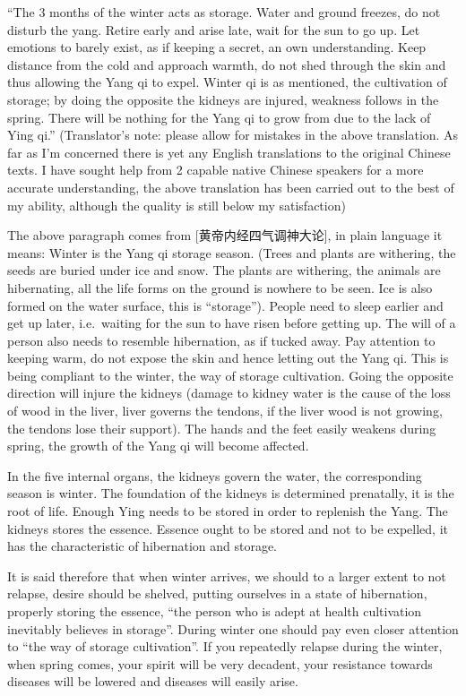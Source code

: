 \documentclass[
]{book}
\begin{document}
``The 3 months of the winter acts as storage. Water and ground freezes, do not disturb the yang. Retire early and arise late, wait for the sun to go up. Let emotions to barely exist, as if keeping a secret, an own understanding. Keep distance from the cold and approach warmth, do not shed through the skin and thus allowing the Yang qi to expel. Winter qi is as mentioned, the cultivation of storage; by doing the opposite the kidneys are injured, weakness follows in the spring. There will be nothing for the Yang qi to grow from due to the lack of Ying qi.'' (Translator's note: please allow for mistakes in the above translation. As far as I'm concerned there is yet any English translations to the original Chinese texts. I have sought help from 2 capable native Chinese speakers for a more accurate understanding, the above translation has been carried out to the best of my ability, although the quality is still below my satisfaction)

The above paragraph comes from {[}黄帝内经四气调神大论{]}, in plain language it means: Winter is the Yang qi storage season. (Trees and plants are withering, the seeds are buried under ice and snow. The plants are withering, the animals are hibernating, all the life forms on the ground is nowhere to be seen. Ice is also formed on the water surface, this is ``storage''). People need to sleep earlier and get up later, i.e.~waiting for the sun to have risen before getting up. The will of a person also needs to resemble hibernation, as if tucked away. Pay attention to keeping warm, do not expose the skin and hence letting out the Yang qi. This is being compliant to the winter, the way of storage cultivation. Going the opposite direction will injure the kidneys (damage to kidney water is the cause of the loss of wood in the liver, liver governs the tendons, if the liver wood is not growing, the tendons lose their support). The hands and the feet easily weakens during spring, the growth of the Yang qi will become affected.

In the five internal organs, the kidneys govern the water, the corresponding season is winter. The foundation of the kidneys is determined prenatally, it is the root of life. Enough Ying needs to be stored in order to replenish the Yang. The kidneys stores the essence. Essence ought to be stored and not to be expelled, it has the characteristic of hibernation and storage.

It is said therefore that when winter arrives, we should to a larger extent to not relapse, desire should be shelved, putting ourselves in a state of hibernation, properly storing the essence, ``the person who is adept at health cultivation inevitably believes in storage''. During winter one should pay even closer attention to ``the way of storage cultivation''. If you repeatedly relapse during the winter, when spring comes, your spirit will be very decadent, your resistance towards diseases will be lowered and diseases will easily arise.
\end{document}
